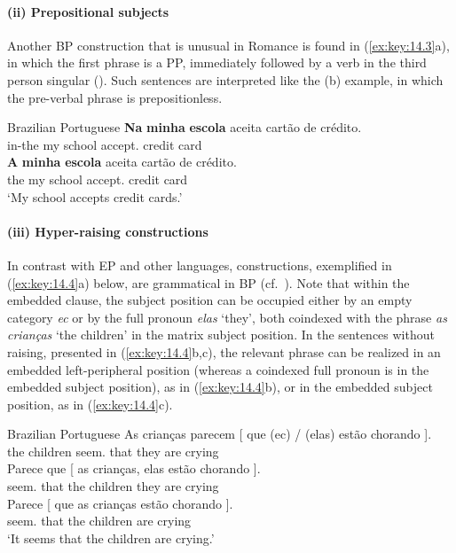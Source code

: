 \documentclass[output=paper]{langsci/langscibook}
\begin{document}
\paragraph*{(ii) Prepositional subjects}

Another \gls{BP} construction that is unusual in
Romance is found in (\ref{ex:key:14.3}a), in which the first phrase is a PP,
immediately followed by a verb in the third person singular
(\citealt{AvelarCyrino2008}). Such sentences are interpreted like the (b)
example, in which the pre-verbal phrase is prepositionless.

\ea%
    \label{ex:key:14.3}Brazilian Portuguese
	\ea
    \gll   \textbf{Na} \textbf{minha} \textbf{escola} aceita {cartão de crédito}.\\
            in-the my school accept.\Tsg{} {credit card}\\
    \ex
    \gll \textbf{A} \textbf{minha} \textbf{escola} aceita {cartão de crédito}.\\
            the my school accept.\Tsg{} {credit card}\\
    \glt    ‘My school accepts credit cards.’
    \z
\z

\paragraph*{(iii) Hyper-raising constructions}

In contrast with \gls{EP} and other  languages, 
constructions, exemplified in (\ref{ex:key:14.4}a) below, are grammatical in
\gls{BP} (cf.\ \citealt{NunesMartins2010}). Note that within the embedded
clause, the subject position can be occupied either by an empty category
\emph{ec} or by the full pronoun \emph{elas} ‘they’, both coindexed with the
phrase \emph{as crianças} ‘the children’ in the matrix subject position.
In the sentences without raising, presented in (\ref{ex:key:14.4}b,c), the
relevant phrase can be realized in an embedded left-peripheral position
(whereas a coindexed full pronoun is in the embedded subject position), as in
(\ref{ex:key:14.4}b), or in the embedded subject position, as in
(\ref{ex:key:14.4}c).\newpage

\ea%
    \label{ex:key:14.4}Brazilian Portuguese
	\ea
	\gll    As crianças parecem [ que (ec) / (elas) estão chorando ].\\
            the children seem.\Tpl{} {} that {} {} \hphantom{(}they are crying\\
    \ex
    \gll Parece que [ as crianças, elas estão chorando ].\\
      seem.\Tsg{} that {} the children they are crying\\
    \ex
    \gll    Parece [ que as crianças estão chorando ].\\
            seem.\Tsg{} {} that the children are crying\\
    \glt    ‘It seems that the children are crying.’
    \z
\z
\end{document}
